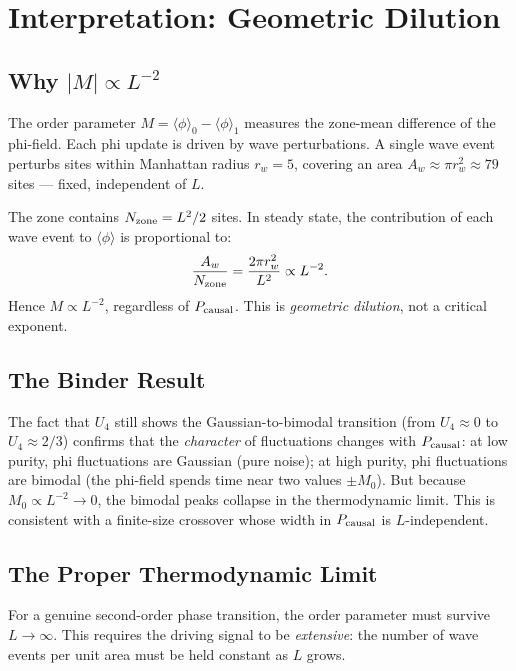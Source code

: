 \documentclass[12pt,a4paper]{article}
\begin{document}
\section{Interpretation: Geometric Dilution}
\label{sec:dilution}

\subsection{Why $|M| \propto L^{-2}$}

The order parameter $M = \langle\phi\rangle_0 - \langle\phi\rangle_1$ measures
the zone-mean difference of the phi-field.
Each phi update is driven by wave perturbations.
A single wave event perturbs sites within Manhattan radius $r_w = 5$,
covering an area $A_w \approx \pi r_w^2 \approx 79$ sites --- fixed,
independent of $L$.

The zone contains $N_{\rm zone} = L^2/2$ sites.
In steady state, the contribution of each wave event to $\langle\phi\rangle$
is proportional to:
\begin{equation}
  \frac{A_w}{N_{\rm zone}} = \frac{2\pi r_w^2}{L^2} \propto L^{-2}.
\end{equation}
Hence $M \propto L^{-2}$, regardless of $P_{\rm causal}$.
This is \emph{geometric dilution}, not a critical exponent.

\subsection{The Binder Result}

The fact that $U_4$ still shows the Gaussian-to-bimodal transition
(from $U_4 \approx 0$ to $U_4 \approx 2/3$) confirms that the
\emph{character} of fluctuations changes with $P_{\rm causal}$:
at low purity, phi fluctuations are Gaussian (pure noise);
at high purity, phi fluctuations are bimodal (the phi-field spends time
near two values $\pm M_0$).
But because $M_0 \propto L^{-2} \to 0$, the bimodal peaks collapse in the
thermodynamic limit.
This is consistent with a finite-size crossover whose width in $P_{\rm causal}$
is $L$-independent.

\subsection{The Proper Thermodynamic Limit}

For a genuine second-order phase transition, the order parameter must survive
$L \to \infty$.
This requires the driving signal to be \emph{extensive}: the number of wave
events per unit area must be held constant as $L$ grows.
\end{document}
